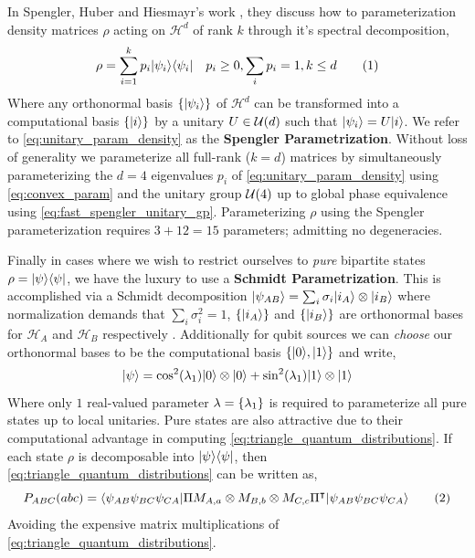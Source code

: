 \documentclass[aps, 10pt, english, twoside, pra, nofootinbib, longbibliography]{revtex4-1}
\theoremstyle{plain}
\theoremstyle{definition}
\theoremstyle{remark}
\newcommand{\netperm}{\Pi}
\newcommand{\Hilb}{\mathcal{H}}
\newcommand{\term}[1]{\textcolor{Mahogany}{\textbf{#1}}}
\begin{document}
    In Spengler, Huber and Hiesmayr's work \cite{Spengler_2010_Unitary}, they discuss how to parameterization density matrices $\rho$ acting on $\Hilb^d$ of rank $k$ through it's spectral decomposition,
    \[ \rho = \sum_{i=1}^{k} p_i \ket{\psi_i}\bra{\psi_i} \quad p_i \geq 0, \sum_{i} p_i = 1, k \leq d \eq \label{eq:unitary_param_density} \]
    Where any orthonormal basis $\bc{\ket{\psi_i}}$ of $\Hilb^d$ can be transformed into a computational basis $\bc{\ket{i}}$ by a unitary $U \in \mathcal{U}\br{d}$ such that $\ket{\psi_i} = U\ket{i}$. We refer to \cref{eq:unitary_param_density} as the \term{Spengler Parametrization}. Without loss of generality we parameterize all full-rank ($k=d$) matrices by simultaneously parameterizing the $d=4$ eigenvalues $p_i$ of \cref{eq:unitary_param_density} using \cref{eq:convex_param} and the unitary group $\mathcal{U}\br{4}$ up to global phase equivalence using \cref{eq:fast_spengler_unitary_gp}. Parameterizing $\rho$ using the Spengler parameterization requires $3 + 12 = 15$ parameters; admitting no degeneracies.

    Finally in cases where we wish to restrict ourselves to \textit{pure} bipartite states $\rho = \ket{\psi}\bra{\psi}$, we have the luxury to use a \term{Schmidt Parametrization}. This is accomplished via a Schmidt decomposition $\ket{\psi_{AB}} = \sum_{i}\sigma_i \ket{i_A}\otimes\ket{i_B}$ where normalization demands that $\sum_{i} \sigma_i^2 = 1$, $\bc{\ket{i_A}}$ and $\bc{\ket{i_B}}$ are orthonormal bases for $\Hilb_A$ and $\Hilb_B$ respectively \cite{Neilsen_Chaung_2011}. Additionally for qubit sources we can \textit{choose} our orthonormal bases to be the computational basis $\bc{\ket{0}, \ket{1}}$ and write,
    \[ \ket{\psi} = \cos^2\br{\lambda_1} \ket{0} \otimes \ket{0} + \sin^2\br{\lambda_1} \ket{1} \otimes \ket{1} \]
    Where only $1$ real-valued parameter $\lambda = \bc{\lambda_1}$ is required to parameterize all pure states up to local unitaries. Pure states are also attractive due to their computational advantage in computing \cref{eq:triangle_quantum_distributions}. If each state $\rho$ is decomposable into $\ket{\psi}\bra{\psi}$, then \cref{eq:triangle_quantum_distributions} can be written as,
    \[ \prob[ABC]\br{abc} = \bramidket{\psi_{AB}\psi_{BC}\psi_{CA}}{\netperm M_{A,a}\otimes M_{B,b} \otimes M_{C,c} \netperm^\intercal}{\psi_{AB}\psi_{BC}\psi_{CA}} \eq \label{eq:pure_state_quantum_triangle} \]
    Avoiding the expensive matrix multiplications of \cref{eq:triangle_quantum_distributions}.
\end{document}
